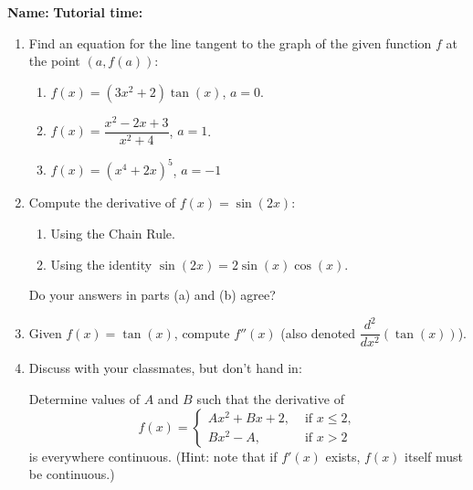 \documentclass[12pt]{article}
\begin{document}
{\bf \large Name:} \hspace{2.5in} {\bf Tutorial time:}

\bigskip

\bigskip

\thispagestyle{fancy}

 \begin{enumerate}
 \item  Find an equation for the line tangent to the graph of the given function $f$ at the point $(a,f(a))$:
\begin{enumerate}
 \item $f(x) = (3x^2+2)\tan(x)$, $a=0$.

\vspace{2.5in}

 \item $f(x) = \dfrac{x^2-2x+3}{x^2+4}$, $a=1$.

\vspace{2.5in}

 \item $f(x) = (x^4+2x)^5$, $a=-1$ 
\end{enumerate}
\newpage

\item Compute the derivative of $f(x)=\sin(2x)$:
\begin{enumerate}
 \item Using the Chain Rule.

\vspace{1in}

 \item Using the identity $\sin(2x)=2\sin(x)\cos(x)$.

\vspace{1in}
\end{enumerate}
Do your answers in parts (a) and (b) agree?

\vspace{0.5in}

\item Given $f(x)=\tan(x)$, compute $f''(x)$ (also denoted $\dfrac{d^2}{dx^2}(\tan(x))$).

\vspace{2.5in}

\item Discuss with your classmates, but don't hand in:

Determine values of $A$ and $B$ such that the derivative of 
\[
f(x) = \begin{cases}Ax^2+Bx+2, & \text{ if } x\leq 2,\\ Bx^2-A, & \text{ if } x>2\end{cases}
\]
is everywhere continuous. (Hint: note that if $f'(x)$ exists, $f(x)$ itself must be continuous.)
\end{enumerate}
\end{document}
